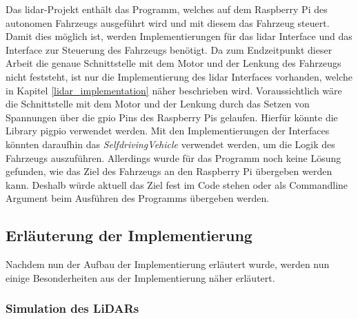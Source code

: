 Das \ac{lidar}-Projekt enthält das Programm, welches auf dem Raspberry Pi des autonomen Fahrzeugs ausgeführt wird und mit diesem das Fahrzeug steuert. 
Damit dies möglich ist, werden Implementierungen für das \ac{lidar} Interface und das Interface zur Steuerung des Fahrzeugs benötigt. 
Da zum Endzeitpunkt dieser Arbeit die genaue Schnittstelle mit dem Motor und der Lenkung des Fahrzeugs nicht feststeht, 
ist nur die Implementierung des \ac{lidar} Interfaces vorhanden, welche in Kapitel \ref{lidar_implementation} näher beschrieben wird. 
Voraussichtlich wäre die Schnittstelle mit dem Motor und der Lenkung durch das Setzen von Spannungen über die \ac{gpio} Pins des Raspberry Pis gelaufen. 
Hierfür könnte die Library pigpio verwendet werden.  
Mit den Implementierungen der Interfaces könnten daraufhin das \textit{SelfdrivingVehicle} verwendet werden, um die Logik des Fahrzeugs auszuführen. 
Allerdings wurde für das Programm noch keine Lösung gefunden, wie das Ziel des Fahrzeugs an den Raspberry Pi übergeben werden kann. 
Deshalb würde aktuell das Ziel fest im Code stehen oder als Commandline Argument beim Ausführen des Programms übergeben werden. 

\subsection{Erläuterung der Implementierung}

Nachdem nun der Aufbau der Implementierung erläutert wurde, werden nun einige Besonderheiten aus der Implementierung näher erläutert. 

\subsubsection{Simulation des LiDARs}

